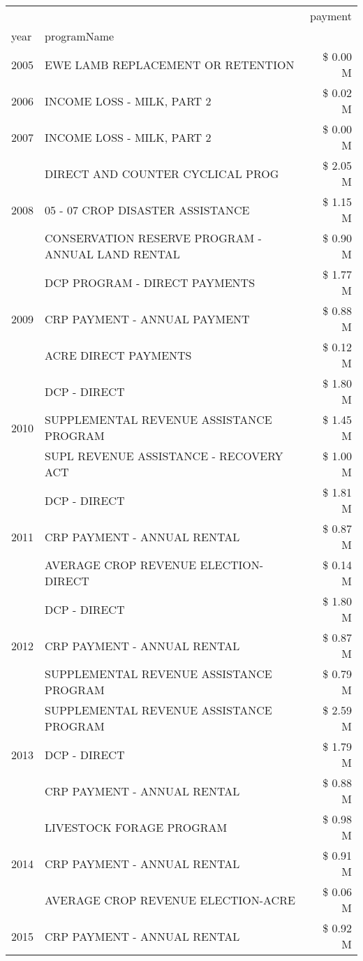 \begin{tabular}{llr}
\toprule
 &  & payment \\
year & programName &  \\
\midrule
2005 & EWE LAMB REPLACEMENT OR RETENTION & \$ 0.00 M \\
\cline{1-3}
2006 & INCOME LOSS - MILK, PART 2 & \$ 0.02 M \\
\cline{1-3}
2007 & INCOME LOSS - MILK, PART 2 & \$ 0.00 M \\
\cline{1-3}
\multirow[t]{3}{*}{2008} & DIRECT AND COUNTER CYCLICAL PROG & \$ 2.05 M \\
 & 05 - 07 CROP DISASTER ASSISTANCE & \$ 1.15 M \\
 & CONSERVATION RESERVE PROGRAM - ANNUAL LAND RENTAL & \$ 0.90 M \\
\cline{1-3}
\multirow[t]{3}{*}{2009} & DCP PROGRAM - DIRECT PAYMENTS & \$ 1.77 M \\
 & CRP PAYMENT - ANNUAL PAYMENT & \$ 0.88 M \\
 & ACRE DIRECT PAYMENTS & \$ 0.12 M \\
\cline{1-3}
\multirow[t]{3}{*}{2010} & DCP - DIRECT & \$ 1.80 M \\
 & SUPPLEMENTAL REVENUE ASSISTANCE PROGRAM & \$ 1.45 M \\
 & SUPL REVENUE ASSISTANCE - RECOVERY ACT & \$ 1.00 M \\
\cline{1-3}
\multirow[t]{3}{*}{2011} & DCP - DIRECT & \$ 1.81 M \\
 & CRP PAYMENT - ANNUAL RENTAL & \$ 0.87 M \\
 & AVERAGE CROP REVENUE ELECTION-DIRECT & \$ 0.14 M \\
\cline{1-3}
\multirow[t]{3}{*}{2012} & DCP - DIRECT & \$ 1.80 M \\
 & CRP PAYMENT - ANNUAL RENTAL & \$ 0.87 M \\
 & SUPPLEMENTAL REVENUE ASSISTANCE PROGRAM & \$ 0.79 M \\
\cline{1-3}
\multirow[t]{3}{*}{2013} & SUPPLEMENTAL REVENUE ASSISTANCE PROGRAM & \$ 2.59 M \\
 & DCP - DIRECT & \$ 1.79 M \\
 & CRP PAYMENT - ANNUAL RENTAL & \$ 0.88 M \\
\cline{1-3}
\multirow[t]{3}{*}{2014} & LIVESTOCK FORAGE PROGRAM & \$ 0.98 M \\
 & CRP PAYMENT - ANNUAL RENTAL & \$ 0.91 M \\
 & AVERAGE CROP REVENUE ELECTION-ACRE & \$ 0.06 M \\
\cline{1-3}
\multirow[t]{3}{*}{2015} & CRP PAYMENT - ANNUAL RENTAL & \$ 0.92 M \\

\end{tabular}
